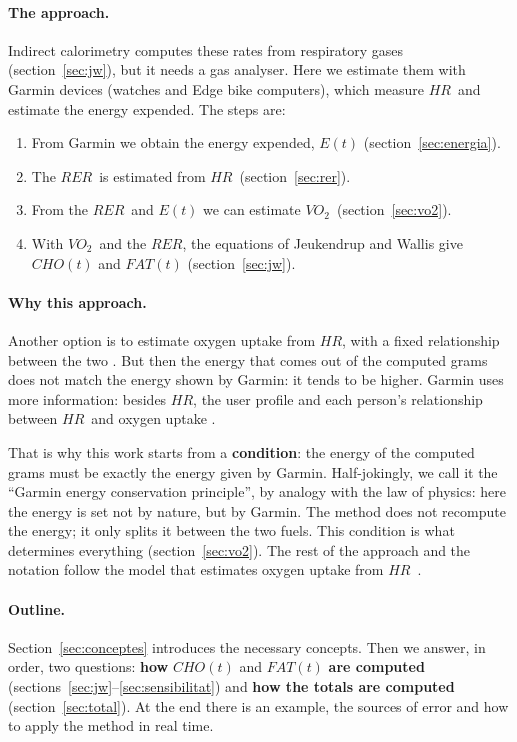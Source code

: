 \documentclass[10pt,a4paper]{article}
\newcommand{\cho}{\ensuremath{\mathit{CHO}}}               %
\newcommand{\fat}{\ensuremath{\mathit{FAT}}}
\newcommand{\VO}{\ensuremath{\mathit{VO}_2}}               %
\newcommand{\RER}{\ensuremath{\mathit{RER}}}
\newcommand{\FC}{\ensuremath{\mathit{HR}}}
\begin{document}
\paragraph{The approach.} Indirect calorimetry computes these rates from respiratory gases
(section~\ref{sec:jw}), but it needs a gas analyser. Here we estimate them with Garmin
devices (watches and Edge bike computers), which measure \FC\ and estimate the energy
expended. The steps are:
\begin{enumerate}[leftmargin=*,itemsep=0pt]
  \item From Garmin we obtain the energy expended, $E(t)$ (section~\ref{sec:energia}).
  \item The \RER\ is estimated from \FC\ (section~\ref{sec:rer}).
  \item From the \RER\ and $E(t)$ we can estimate \VO\ (section~\ref{sec:vo2}).
  \item With \VO\ and the \RER, the equations of Jeukendrup and Wallis give $\cho(t)$ and
        $\fat(t)$ (section~\ref{sec:jw}).
\end{enumerate}

\paragraph{Why this approach.} Another option is to estimate oxygen uptake from \FC, with a
fixed relationship between the two \citep{swain1997,chofatfc2026}. But then the energy that
comes out of the computed grams does not match the energy shown by Garmin: it tends to be
higher. Garmin uses more information: besides \FC, the user profile and each person's
relationship between \FC\ and oxygen uptake \citep{firstbeat2007}.

That is why this work starts from a \textbf{condition}: the energy of the computed grams
must be exactly the energy given by Garmin. Half-jokingly, we call it the ``Garmin energy
conservation principle'', by analogy with the law of physics: here the energy is set not
by nature, but by Garmin. The method does not recompute the energy; it only splits it
between the two fuels. This condition is what determines everything
(section~\ref{sec:vo2}). The rest of the approach and the notation follow the model that
estimates oxygen uptake from \FC\ \citep{chofatfc2026}.

\paragraph{Outline.} Section~\ref{sec:conceptes} introduces the necessary concepts. Then we
answer, in order, two questions: \textbf{how} $\cho(t)$ and $\fat(t)$ \textbf{are computed}
(sections~\ref{sec:jw}--\ref{sec:sensibilitat}) and \textbf{how the totals are computed}
(section~\ref{sec:total}). At the end there is an example, the sources of error and how to
apply the method in real time.
\end{document}
